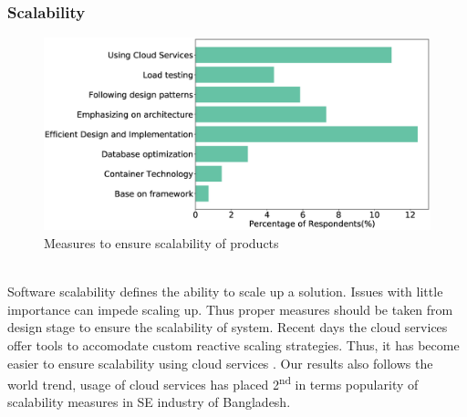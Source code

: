 \subsubsection{Scalability}
\label{Scalability}
\begin{figure}[htbp]
\includegraphics[scale=0.28]{Figures/Scalability.eps} 
\caption{Measures to ensure scalability of products}
\label{fig:Measures to ensure scalability}
\end{figure}
\hfill\\
 Software scalability defines the ability to scale up a solution. Issues with little importance can impede scaling up. Thus proper measures should be taken from design stage to ensure the scalability of system. Recent days the cloud services offer tools to accomodate custom reactive scaling strategies. Thus, it has become easier to ensure scalability using cloud services \citep{Falatah2014}. Our results  also follows the world trend, usage of cloud services has placed 2\textsuperscript{nd} in terms popularity of scalability measures in SE industry of Bangladesh.
